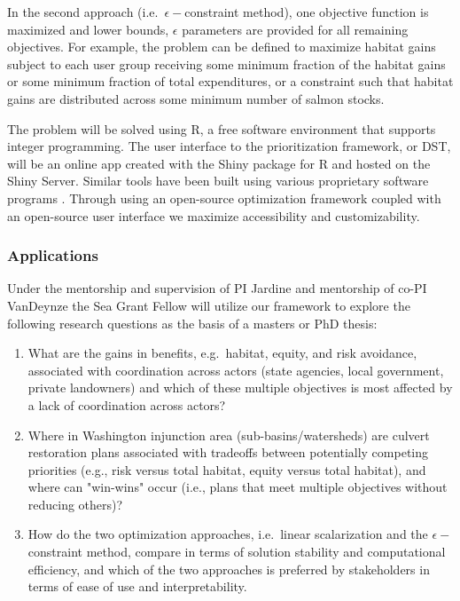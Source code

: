 \documentclass[12pt]{elsarticle}
\begin{document}
In the second approach (i.e.\ $\epsilon-$constraint method), one objective function is maximized and lower bounds, $\epsilon$ parameters are provided for all remaining objectives. For example, the problem can be defined to maximize habitat gains subject to each user group receiving some minimum fraction of the habitat gains or some minimum fraction of total expenditures, or a constraint such that habitat gains are distributed across some minimum number of salmon stocks.

The problem will be solved using R, a free software environment that supports integer programming. The user interface to the prioritization framework, or DST, will be an online app created with the Shiny package for R and hosted on the Shiny Server. Similar tools have been built using various proprietary software programs \citep{optipass2015migratory, moody2017pet, mcmanamay2019commonalities}. Through using an open-source optimization framework coupled with an open-source user interface we maximize accessibility and customizability.  

\subsubsection{Applications}

Under the mentorship and supervision of PI Jardine and mentorship of co-PI VanDeynze the Sea Grant Fellow will utilize our framework to explore the following research questions as the basis of a masters or PhD thesis:

\begin{enumerate}
\item What are the gains in benefits, e.g.\ habitat, equity, and risk avoidance, associated with coordination across actors (state agencies, local government, private landowners) and which of these multiple objectives is most affected by a lack of coordination across actors?
\item Where in Washington injunction area (sub-basins/watersheds) are culvert restoration plans associated with tradeoffs between potentially competing priorities (e.g., risk versus total habitat, equity versus total habitat), and where can "win-wins" occur (i.e., plans that meet multiple objectives without reducing others)?
\item How do the two optimization approaches, i.e.\ linear scalarization and the $\epsilon-$constraint method, compare in terms of solution stability and computational efficiency, and which of the two approaches is preferred by stakeholders in terms of ease of use and interpretability.
\end{enumerate}
\end{document}
